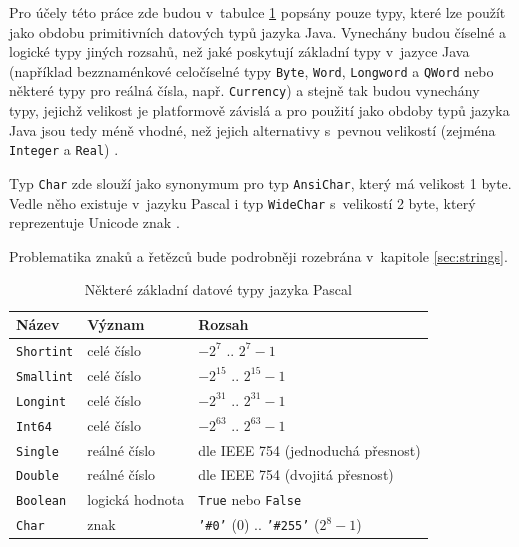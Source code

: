\documentclass[onepage, a4paper, 12pt]{bakalarka}
\begin{document}
Pro účely této práce zde budou v~tabulce \ref{table:pas-types} popsány pouze typy, které lze použít jako obdobu primitivních datových typů jazyka Java. Vynechány budou číselné a logické typy jiných rozsahů, než jaké poskytují základní typy v~jazyce Java (například bezznaménkové celočíselné typy \texttt{Byte}, \texttt{Word}, \texttt{Longword} a \texttt{QWord} nebo některé typy pro reálná čísla, např. \texttt{Currency}) a stejně tak budou vynechány typy, jejichž velikost je platformově závislá a pro použití jako obdoby typů jazyka Java jsou tedy méně vhodné, než jejich alternativy s~pevnou velikostí (zejména \texttt{Integer} a \texttt{Real}) \cite{pas-guide-types, pas-guide-integer, pas-guide-boolean, pas-guide-real}.\par

Typ \texttt{Char} zde slouží jako synonymum pro typ \texttt{AnsiChar}, který má velikost 1 byte. Vedle něho existuje v~jazyku Pascal i typ \texttt{WideChar} s~velikostí 2 byte, který reprezentuje Unicode znak \cite{pas-guide-types, pas-guide-ansichar, pas-guide-widechar}.\par

Problematika znaků a řetězců bude podrobněji rozebrána v~kapitole \ref{sec:strings}.

\begin{table}\centering
\caption{Některé základní datové typy jazyka Pascal}
\begin{tabular}{| l | l | l |}
\hline
\textbf{Název} & \textbf{Význam} & \textbf{Rozsah} \\ \hline
\texttt{Shortint} & celé číslo & $-2^7$ .. $2^7-1$ \\ \hline
\texttt{Smallint} & celé číslo & $-2^{15}$ .. $2^{15}-1$ \\ \hline
\texttt{Longint} & celé číslo & $-2^{31}$ .. $2^{31}-1$ \\ \hline
\texttt{Int64} & celé číslo & $-2^{63}$ .. $2^{63}-1$ \\ \hline
\texttt{Single} & reálné číslo & dle IEEE 754 (jednoduchá přesnost) \\ \hline
\texttt{Double} & reálné číslo & dle IEEE 754 (dvojitá přesnost) \\ \hline
\texttt{Boolean} & logická hodnota & \texttt{True} nebo \texttt{False} \\ \hline
\texttt{Char} & znak & \texttt{'\#0'} ($0$) .. \texttt{'\#255'} ($2^{8} - 1$) \\ \hline
\end{tabular}
\label{table:pas-types}
\end{table}
\end{document}
